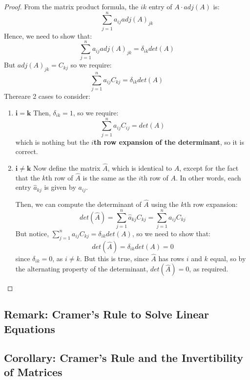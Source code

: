 \documentclass{exam}
\begin{document}
\begin{proof}

From the matrix product formula, the $ik$ entry of $A \cdot adj(A)$ is:
\[
\sum_{j = 1}^n a_{ij}adj(A)_{jk}
\]
Hence, we need to show that:
\[
\sum_{j = 1}^n a_{ij}adj(A)_{jk} = \delta_{ik}det(A)
\]
But $adj(A)_{jk} = C_{kj}$ so we require:
\[
\sum_{j = 1}^n a_{ij}C_{kj} = \delta_{ik}det(A)
\]
Thereare 2 cases to consider:

\begin{enumerate}
    \item $\boldsymbol{i = k}$
    Then, $\delta_{ik} = 1$, so we require:
    \[
    \sum_{j = 1}^n a_{ij}C_{ij} = det(A)
    \]
    which is nothing but the \textbf{$i$th row expansion of the determinant}, so it is correct.
    \item $\boldsymbol{i \neq k}$
    Now define the matrix $\hat{A}$, which is identical to $A$, except for the fact that the $k$th row of $\hat{A}$ is the same as the $i$th row of $A$. In other words, each entry $\hat{a}_{kj}$ is given by $a_{ij}$.
    
    \bigskip
    
    Then, we can compute the determinant of $\hat{A}$ using the $k$th row expansion:
    \[
    det(\hat{A}) = \sum_{j = 1}^n \hat{a}_{kj}C_{kj} = \sum_{j = 1}^n a_{ij}C_{kj}
    \]
    But notice, $\sum_{j = 1}^n a_{ij}C_{kj} = \delta_{ik}det(A)$, so we need to show that:
    \[
    det(\hat{A}) = \delta_{ik}det(A) = 0
    \]
    since $\delta_{ik} = 0$, as $i \neq k$. But this is true, since $\hat{A}$ has rows $i$ and $k$ equal, so by the alternating property of the determinant, $det(\hat{A}) = 0$, as required.
\end{enumerate}

\end{proof}

\subsection{Remark: Cramer's Rule to Solve Linear Equations}


\subsection{Corollary: Cramer's Rule and the Invertibility of Matrices}
\end{document}
